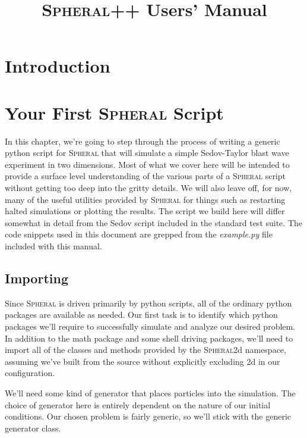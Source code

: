 \documentclass[11pt]{memoir}
\title{\textsc{Spheral}++ Users' Manual}
\begin{document}
\frontmatter
\maketitle
\tableofcontents*


\mainmatter
\chapter{Introduction}

\chapter{Your First \textsc{Spheral} Script}

\lstset{basicstyle=\small,style=myCustomPythonStyle}

In this chapter, we're going to step through the process of writing a generic python script for \textsc{Spheral} that will simulate a simple Sedov-Taylor blast wave experiment in two dimensions. 
Most of what we cover here will be intended to provide a surface level understanding of the various parts of a \textsc{Spheral} script without getting too deep into the gritty details. 
We will also leave off, for now, many of the useful utilities provided by \textsc{Spheral} for things such as restarting halted simulations or plotting the results. 
The script we build here will differ somewhat in detail from the Sedov script included in the standard test suite. 
The code snippets used in this document are grepped from the \textit{example.py} file included with this manual.

\section{Importing}

Since \textsc{Spheral} is driven primarily by python scripts, all of the ordinary python packages are available as needed. 
Our first task is to identify which python packages we'll require to successfully simulate and analyze our desired problem. 
In addition to the math package and some shell driving packages, we'll need to import all of the classes and methods provided by the \textsc{Spheral}2d namespace, assuming we've built from the source without explicitly excluding 2d in our configuration.



We'll need some kind of generator that places particles into the simulation. 
The choice of generator here is entirely dependent on the nature of our initial conditions. 
Our chosen problem is fairly generic, so we'll stick with the generic generator class.
\end{document}
